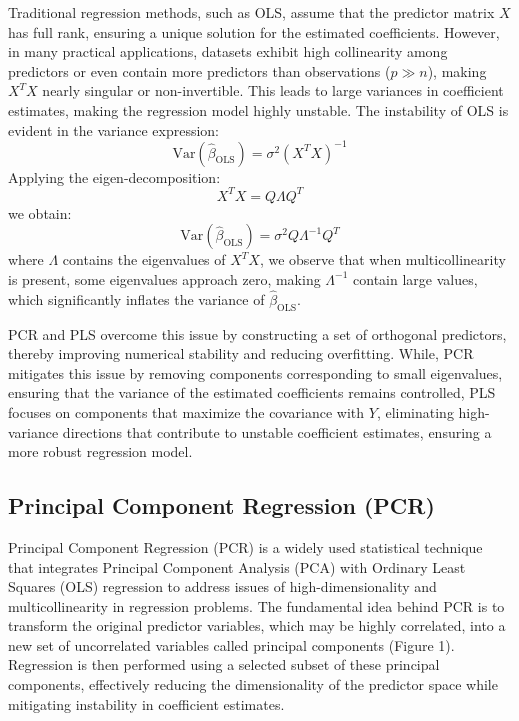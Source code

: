 \documentclass[11pt,twoside,a4paper]{article}
\begin{document}
Traditional regression methods, such as OLS, assume that the predictor matrix \( X \) has full rank, ensuring a unique solution for the estimated coefficients. However, in many practical applications, datasets exhibit high collinearity among predictors or even contain more predictors than observations (\( p \gg n \)), making \( X^T X \) nearly singular or non-invertible. This leads to large variances in coefficient estimates, making the regression model highly unstable. The instability of OLS is evident in the variance expression:
\begin{equation} 
\text{Var}(\hat{\beta}_{\text{OLS}}) = \sigma^2 (X^T X)^{-1}
\end{equation}
Applying the eigen-decomposition:
\begin{equation}
X^T X = Q \Lambda Q^T
\end{equation}
we obtain:
\begin{equation}
\text{Var}(\hat{\beta}_{\text{OLS}}) = \sigma^2 Q \Lambda^{-1} Q^T
\end{equation}
where \( \Lambda \) contains the eigenvalues of \( X^T X \), we observe that when multicollinearity is present, some eigenvalues approach zero, making \( \Lambda^{-1} \) contain large values, which significantly inflates the variance of \( \hat{\beta}_{\text{OLS}} \).

PCR and PLS overcome this issue by constructing a set of orthogonal predictors, thereby improving numerical stability and reducing overfitting. While,  PCR mitigates this issue by removing components corresponding to small eigenvalues, ensuring that the variance of the estimated coefficients remains controlled, PLS focuses on components that maximize the covariance with \( Y \), eliminating high-variance directions that contribute to unstable coefficient estimates, ensuring a more robust regression model.


\subsection{Principal Component Regression (PCR)}

Principal Component Regression (PCR) is a widely used statistical technique that integrates Principal Component Analysis (PCA) with Ordinary Least Squares (OLS) regression to address issues of high-dimensionality and multicollinearity in regression problems. The fundamental idea behind PCR is to transform the original predictor variables, which may be highly correlated, into a new set of uncorrelated variables called principal components (Figure 1). Regression is then performed using a selected subset of these principal components, effectively reducing the dimensionality of the predictor space while mitigating instability in coefficient estimates.
\end{document}
